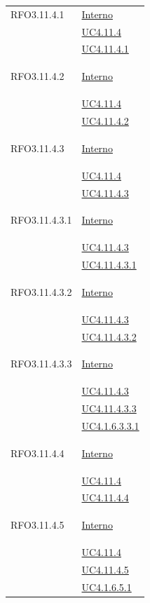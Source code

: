 \begin{longtable}{|>{\centering}m{5cm}|m{5cm}<{\centering}|}
\hypertarget{RFO3.11.4.1}{RFO3.11.4.1} & \hyperlink{Interno}{Interno}\\
&\hyperref[UC4.11.4]{UC4.11.4}\\
&\hyperref[UC4.11.4.1]{UC4.11.4.1}\\ \hline

\hypertarget{RFO3.11.4.2}{RFO3.11.4.2} & \hyperlink{Interno}{Interno}\\
&\hyperref[UC4.11.4]{UC4.11.4}\\
&\hyperref[UC4.11.4.2]{UC4.11.4.2}\\ \hline

\hypertarget{RFO3.11.4.3}{RFO3.11.4.3} & \hyperlink{Interno}{Interno}\\
&\hyperref[UC4.11.4]{UC4.11.4}\\
&\hyperref[UC4.11.4.3]{UC4.11.4.3}\\ \hline

\hypertarget{RFO3.11.4.3.1}{RFO3.11.4.3.1} & \hyperlink{Interno}{Interno}\\
& \hyperref[UC4.11.4.3]{UC4.11.4.3}\\
& \hyperref[UC4.11.4.3.1]{UC4.11.4.3.1}\\ \hline

\hypertarget{RFO3.11.4.3.2}{RFO3.11.4.3.2} & \hyperlink{Interno}{Interno}\\
& \hyperref[UC4.11.4.3]{UC4.11.4.3}\\
& \hyperref[UC4.11.4.3.2]{UC4.11.4.3.2}\\ \hline

\hypertarget{RFO3.11.4.3.3}{RFO3.11.4.3.3} & \hyperlink{Interno}{Interno}\\
& \hyperref[UC4.11.4.3]{UC4.11.4.3}\\
&\hyperref[UC4.11.4.3.3]{UC4.11.4.3.3}\\
&\hyperref[UC4.1.6.3.3.1]{UC4.1.6.3.3.1}\\ \hline

\hypertarget{RFO3.11.4.4}{RFO3.11.4.4} & \hyperlink{Interno}{Interno}\\
&\hyperref[UC4.11.4]{UC4.11.4}\\
&\hyperref[UC4.11.4.4]{UC4.11.4.4}\\ \hline

\hypertarget{RFO3.11.4.5}{RFO3.11.4.5} & \hyperlink{Interno}{Interno}\\
&\hyperref[UC4.11.4]{UC4.11.4}\\
&\hyperref[UC4.11.4.5]{UC4.11.4.5}\\
&\hyperref[UC4.1.6.5.1]{UC4.1.6.5.1}\\ \hline


\end{longtable}
